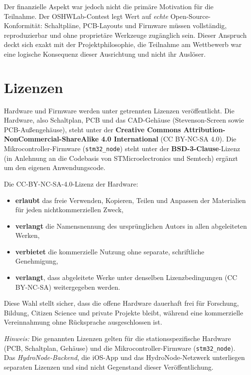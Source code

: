 Der finanzielle Aspekt war jedoch nicht die primäre Motivation für die Teilnahme. Der OSHWLab-Contest legt Wert auf \textit{echte} Open-Source-Konformität: Schaltpläne, PCB-Layouts und Firmware müssen vollständig, reproduzierbar und ohne proprietäre Werkzeuge zugänglich sein. Dieser Anspruch deckt sich exakt mit der Projektphilosophie, die Teilnahme am Wettbewerb war eine logische Konsequenz dieser Ausrichtung und nicht ihr Auslöser.

\section*{Lizenzen}

Hardware und Firmware werden unter getrennten Lizenzen veröffentlicht. Die Hardware, also Schaltplan, PCB und das CAD-Gehäuse (Stevenson-Screen sowie PCB-Außengehäuse), steht unter der \textbf{Creative Commons Attribution-NonCommercial-ShareAlike 4.0 International} (CC BY-NC-SA 4.0). Die Mikrocontroller-Firmware (\texttt{stm32\_node}) steht unter der \textbf{BSD-3-Clause}-Lizenz (in Anlehnung an die Codebasis von STMicroelectronics und Semtech) ergänzt um den eigenen Anwendungscode.

Die CC-BY-NC-SA-4.0-Lizenz der Hardware:
\begin{itemize}
  \item \textbf{erlaubt} das freie Verwenden, Kopieren, Teilen und Anpassen der Materialien für jeden nichtkommerziellen Zweck,
  \item \textbf{verlangt} die Namensnennung des ursprünglichen Autors in allen abgeleiteten Werken,
  \item \textbf{verbietet} die kommerzielle Nutzung ohne separate, schriftliche Genehmigung,
  \item \textbf{verlangt}, dass abgeleitete Werke unter denselben Lizenzbedingungen (CC BY-NC-SA) weitergegeben werden.
\end{itemize}

Diese Wahl stellt sicher, dass die offene Hardware dauerhaft frei für Forschung, Bildung, Citizen Science und private Projekte bleibt, während eine kommerzielle Vereinnahmung ohne Rücksprache ausgeschlossen ist.

\textit{Hinweis:} Die genannten Lizenzen gelten für die stationsspezifische Hardware (PCB, Schaltplan, Gehäuse) und die Mikrocontroller-Firmware (\texttt{stm32\_node}). Das \textit{HydroNode-Backend}, die iOS-App und das HydroNode-Netzwerk unterliegen separaten Lizenzen und sind nicht Gegenstand dieser Veröffentlichung.

